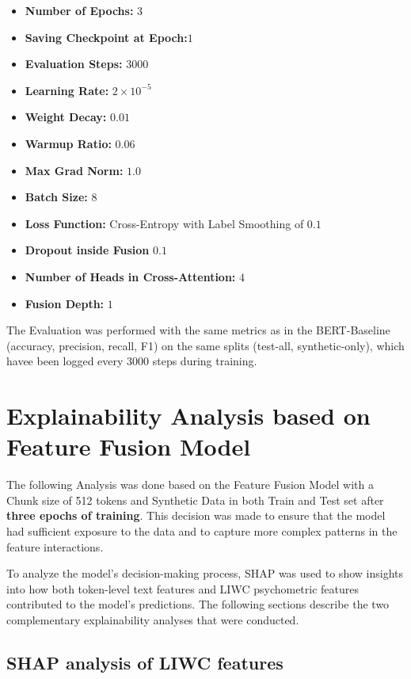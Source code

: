 \begin{itemize}
\item \textbf{Number of Epochs:} \(3\) 
\item \textbf{Saving Checkpoint at Epoch:}\(1\) 
\item \textbf{Evaluation Steps:} \(3000\)
\item \textbf{Learning Rate:} \(2\times10^{-5}\)
\item \textbf{Weight Decay:} \(0.01\)
\item \textbf{Warmup Ratio:} \(0.06\)
\item \textbf{Max Grad Norm:} \(1.0\)
\item \textbf{Batch Size:} \(8\)
\item \textbf{Loss Function:} Cross-Entropy with Label Smoothing of \(0.1\)
\item \textbf{Dropout inside Fusion} \(0.1\)
\item \textbf{Number of Heads in Cross-Attention:} \(4\)
\item \textbf{Fusion Depth:} \(1\)
\end{itemize}

The Evaluation was performed with the same metrics as in the BERT-Baseline (accuracy, precision, recall, F1) on the same splits (test-all, synthetic-only), which havee been logged every 3000 steps during training.




\section{Explainability Analysis based on Feature Fusion Model}

The following Analysis was done based on the Feature Fusion Model with a Chunk size of 512 tokens and Synthetic Data in both Train and Test set after \textbf{three epochs of training}. This decision was made to ensure that the model had sufficient exposure to the data and to capture more complex patterns in the feature interactions.

To analyze the model's decision-making process, SHAP was used to show insights into how both token-level text features and LIWC psychometric features contributed to the model's predictions. The following sections describe the two complementary explainability analyses that were conducted.


\subsection{SHAP analysis of LIWC features} \label{sec:shap_analysis_of_liwc_features}

